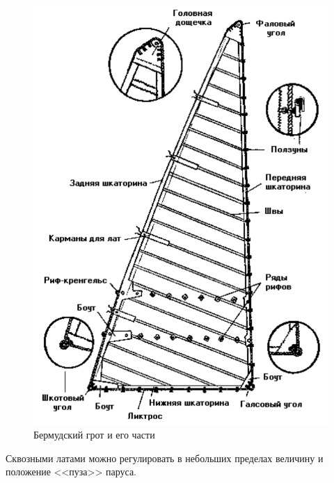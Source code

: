 \documentclass[a4paper, 12pt, twoside, final]{scrbook}
\begin{document}
\begin{figure}[htbp]
\begin{centering}
\includegraphics{Bermudskij_grot}
\par\end{centering}

\protect\caption{\label{fig:35}Бермудский грот и его части}
\end{figure}


Сквозными латами можно регулировать в небольших пределах величину
и положение <<пуза>> паруса.
\end{document}
